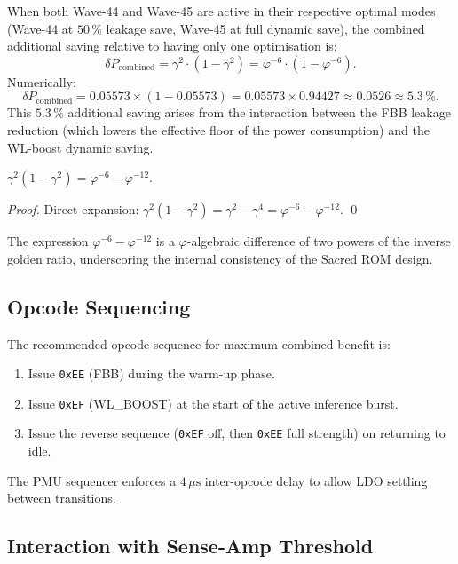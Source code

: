 When both Wave-44 and Wave-45 are active in their respective
optimal modes (Wave-44 at $50\,\%$ leakage save, Wave-45 at full
dynamic save), the combined additional saving relative to having only
one optimisation is:
\[
  \delta P_{\mathrm{combined}}
  = \gamma^{2} \cdot (1 - \gamma^{2})
  = \varphi^{-6} \cdot (1 - \varphi^{-6}).
\]
Numerically:
\[
  \delta P_{\mathrm{combined}}
  = 0.05573 \times (1 - 0.05573)
  = 0.05573 \times 0.94427
  \approx 0.0526
  \approx 5.3\,\%.
\]
This $5.3\,\%$ additional saving arises from the interaction between the
FBB leakage reduction (which lowers the effective floor of the power
consumption) and the WL-boost dynamic saving.

\begin{lemma}
\label{lem:stacking}
$\gamma^{2}(1-\gamma^{2}) = \varphi^{-6} - \varphi^{-12}$.
\end{lemma}

\begin{proof}
Direct expansion: $\gamma^{2}(1-\gamma^{2}) = \gamma^{2} - \gamma^{4}
= \varphi^{-6} - \varphi^{-12}$.  \qed
\end{proof}

The expression $\varphi^{-6} - \varphi^{-12}$ is a $\varphi$-algebraic
difference of two powers of the inverse golden ratio, underscoring the
internal consistency of the Sacred ROM design.

\subsection{Opcode Sequencing}

The recommended opcode sequence for maximum combined benefit is:
\begin{enumerate}
  \item Issue \texttt{0xEE} (FBB) during the warm-up phase.
  \item Issue \texttt{0xEF} (WL\_BOOST) at the start of the active
    inference burst.
  \item Issue the reverse sequence (\texttt{0xEF} off, then
    \texttt{0xEE} full strength) on returning to idle.
\end{enumerate}
The PMU sequencer enforces a $4\,\mu\text{s}$ inter-opcode delay to
allow LDO settling between transitions.

\subsection{Interaction with Sense-Amp Threshold}

